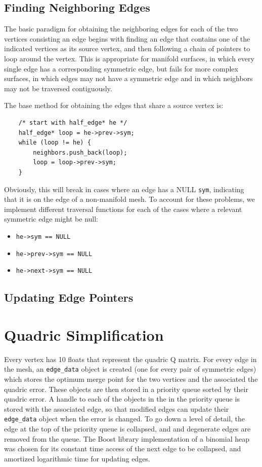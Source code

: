 \documentclass[11pt]{article}
\begin{document}
\subsection{Finding Neighboring Edges}

The basic paradigm for obtaining the neighboring edges for each of the two
vertices consisting an edge begins with finding an edge that contains one of
the indicated vertices as its source vertex, and then following a chain of
pointers to loop around the vertex. This is appropriate for manifold surfaces,
in which every single edge has a corresponding symmetric edge, but fails for
more complex surfaces, in which edges may not have a symmetric edge and in
which neighbors may not be traversed contiguously.

The base method for obtaining the edges that share a source vertex is:

\begin{verbatim}
    /* start with half_edge* he */
    half_edge* loop = he->prev->sym;
    while (loop != he) {
        neighbors.push_back(loop);
        loop = loop->prev->sym;
    }
\end{verbatim}

Obviously, this will break in cases where an edge has a NULL \verb`sym`,
indicating that it is on the edge of a non-manifold mesh. To account for these
problems, we implement different traversal functions for each of the cases where a
relevant symmetric edge might be null:

\begin{itemize}
    \item \verb`he->sym == NULL`
    \item \verb`he->prev->sym == NULL`
    \item \verb`he->next->sym == NULL`
\end{itemize}

\subsection{Updating Edge Pointers}

\section{Quadric Simplification}

Every vertex has 10 floats that represent the quadric Q matrix. For every edge
in the mesh, an \verb`edge_data` object is created (one for every pair of
symmetric edges) which stores the optimum merge point for the two vertices and
the associated the quadric error. These objects are then stored in a priority
queue sorted by their quadric error. A handle to each of the objects in the in
the priority queue is stored with the associated edge, so that modified edges
can update their \verb`edge_data` object when the error is changed. To go down
a level of detail, the edge at the top of the priority queue is collapsed, and
and degenerate edges are removed from the queue. The Boost library
implementation of a binomial heap was chosen for its constant time access of
the next edge to be collapsed, and amortized logarithmic time for updating
edges.
\end{document}

